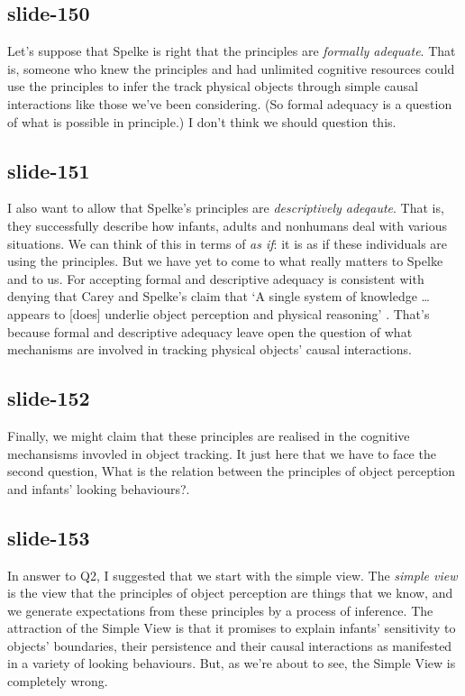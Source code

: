 \documentclass[12pt,\papersize]{extarticle}
\begin{document}
 
\subsection{slide-150}
Let's suppose that Spelke is right that the principles are \emph{formally adequate}.
That is, someone who knew the principles and had unlimited cognitive resources could use the principles to infer the track physical objects through simple causal interactions like those we've been considering.
(So formal adequacy is a question of what is possible in principle.)
I don't think we should question this.
 
 
\subsection{slide-151}
I also want to allow that Spelke's principles are \emph{descriptively adeqaute}. That is, they successfully describe how infants, adults and nonhumans deal with various situations. We can think of this in terms of \emph{as if}: it is as if these individuals are using the principles. But we have yet to come to what really matters to Spelke and to us. For accepting formal and descriptive adequacy is consistent with denying that Carey and Spelke's claim that ‘A single system of knowledge … appears to [does] underlie object perception and physical reasoning’ \citep[p.\ 175]{Carey:1994bh}.
That's because formal and descriptive adequacy leave open the question of what mechanisms are involved in tracking physical objects' causal interactions.
 
 
\subsection{slide-152}
Finally, we might claim that these principles are realised in the cognitive mechansisms invovled in object tracking.
It just here that we have to face the second question, What is the relation between the principles of object perception and infants’ looking behaviours?.
 
 
\subsection{slide-153}
In answer to Q2, I suggested that we start with the simple view.
The \emph{simple view} is the view that the principles of object perception are things that we know, and we generate expectations from these principles by a process of inference.
The attraction of the Simple View is that it promises to explain infants' sensitivity to objects' boundaries, their persistence and their causal interactions as manifested in a variety of looking behaviours.
But, as we're about to see, the Simple View is completely wrong.
 
\end{document}
